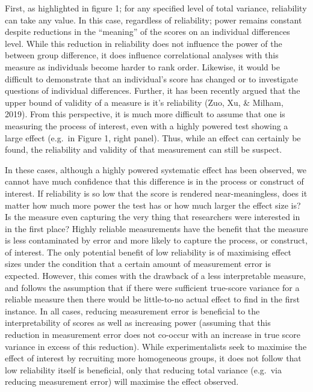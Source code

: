 \documentclass[english,,man]{apa6}
\begin{document}
First, as highlighted in figure 1; for any specified level of total variance, reliability can take any value. In this case, regardless of reliability; power remains constant despite reductions in the \enquote{meaning} of the scores on an individual differences level. While this reduction in reliability does not influence the power of the between group difference, it does influence correlational analyses with this measure as individuals become harder to rank order. Likewise, it would be difficult to demonstrate that an individual's score has changed or to investigate questions of individual differences. Further, it has been recently argued that the upper bound of validity of a measure is it's reliability (Zuo, Xu, \& Milham, 2019). From this perspective, it is much more difficult to assume that one is measuring the process of interest, even with a highly powered test showing a large effect (e.g.~in Figure 1, right panel). Thus, while an effect can certainly be found, the reliability and validity of that measurement can still be suspect.

In these cases, although a highly powered systematic effect has been observed, we cannot have much confidence that this difference is in the process or construct of interest. If reliability is so low that the score is rendered near-meaningless, does it matter how much more power the test has or how much larger the effect size is? Is the measure even capturing the very thing that researchers were interested in in the first place? Highly reliable measurements have the benefit that the measure is less contaminated by error and more likely to capture the process, or construct, of interest. The only potential benefit of low reliability is of maximising effect sizes under the condition that a certain amount of measurement error is expected. However, this comes with the drawback of a less interpretable measure, and follows the assumption that if there were sufficient true-score variance for a reliable measure then there would be little-to-no actual effect to find in the first instance. In all cases, reducing measurement error is beneficial to the interpretability of scores as well as increasing power (assuming that this reduction in measurement error does not co-occur with an increase in true score variance in excess of this reduction). While experimentalists seek to maximise the effect of interest by recruiting more homogeneous groups, it does not follow that low reliability itself is beneficial, only that reducing total variance (e.g.~via reducing measurement error) will maximise the effect observed.
\end{document}
